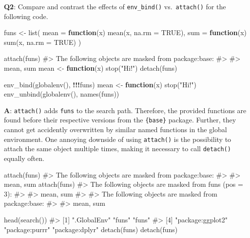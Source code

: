 \documentclass[
]{krantz}
\makeatletter
\newenvironment{Shaded}{\begin{snugshade}}{\end{snugshade}}
\newcommand{\CommentTok}[1]{\textcolor[rgb]{0.56,0.35,0.01}{\textit{#1}}}
\newcommand{\ControlFlowTok}[1]{\textcolor[rgb]{0.13,0.29,0.53}{\textbf{#1}}}
\newcommand{\DataTypeTok}[1]{\textcolor[rgb]{0.13,0.29,0.53}{#1}}
\newcommand{\KeywordTok}[1]{\textcolor[rgb]{0.13,0.29,0.53}{\textbf{#1}}}
\newcommand{\NormalTok}[1]{#1}
\newcommand{\OperatorTok}[1]{\textcolor[rgb]{0.81,0.36,0.00}{\textbf{#1}}}
\newcommand{\OtherTok}[1]{\textcolor[rgb]{0.56,0.35,0.01}{#1}}
\newcommand{\StringTok}[1]{\textcolor[rgb]{0.31,0.60,0.02}{#1}}
\newenvironment{kframe}{%
\medskip{}
\setlength{\fboxsep}{.8em}
 \def\at@end@of@kframe{}%
 \ifinner\ifhmode%
  \def\at@end@of@kframe{\end{minipage}}%
  \begin{minipage}{\columnwidth}%
 \fi\fi%
 \def\FrameCommand##1{\hskip\@totalleftmargin \hskip-\fboxsep
 \colorbox{shadecolor}{##1}\hskip-\fboxsep
     \hskip-\linewidth \hskip-\@totalleftmargin \hskip\columnwidth}%
 \MakeFramed {\advance\hsize-\width
   \@totalleftmargin\z@ \linewidth\hsize
   \@setminipage}}%
 {\par\unskip\endMakeFramed%
 \at@end@of@kframe}
\renewenvironment{Shaded}{\begin{kframe}}{\end{kframe}}
\renewcommand{\KeywordTok} [1]{\textcolor[rgb]{0.00,0.44,0.13}{{#1}}}
\renewcommand{\DataTypeTok}[1]{\textcolor[rgb]{0.56,0.13,0.00}{{#1}}}
\renewcommand{\StringTok}  [1]{\textcolor[rgb]{0.25,0.44,0.63}{{#1}}}
\renewcommand{\CommentTok} [1]{\textcolor[rgb]{0.38,0.63,0.69}{{#1}}}
\renewcommand{\OtherTok}   [1]{\textcolor[rgb]{0.00,0.44,0.13}{{#1}}}
\renewcommand{\NormalTok}  [1]{{#1}}
\makeatother
\begin{document}
\textbf{{Q2}}: Compare and contrast the effects of \texttt{env\_bind()} vs.~\texttt{attach()} for the following code.

\begin{Shaded}
\begin{Highlighting}[]
\NormalTok{funs <-}\StringTok{ }\KeywordTok{list}\NormalTok{(}
  \DataTypeTok{mean =} \ControlFlowTok{function}\NormalTok{(x) }\KeywordTok{mean}\NormalTok{(x, }\DataTypeTok{na.rm =} \OtherTok{TRUE}\NormalTok{),}
  \DataTypeTok{sum =} \ControlFlowTok{function}\NormalTok{(x) }\KeywordTok{sum}\NormalTok{(x, }\DataTypeTok{na.rm =} \OtherTok{TRUE}\NormalTok{)}
\NormalTok{)}

\KeywordTok{attach}\NormalTok{(funs)}
\CommentTok{#> The following objects are masked from package:base:}
\CommentTok{#> }
\CommentTok{#>     mean, sum}
\NormalTok{mean <-}\StringTok{ }\ControlFlowTok{function}\NormalTok{(x) }\KeywordTok{stop}\NormalTok{(}\StringTok{"Hi!"}\NormalTok{)}
\KeywordTok{detach}\NormalTok{(funs)}

\KeywordTok{env_bind}\NormalTok{(}\KeywordTok{globalenv}\NormalTok{(), }\OperatorTok{!!!}\NormalTok{funs)}
\NormalTok{mean <-}\StringTok{ }\ControlFlowTok{function}\NormalTok{(x) }\KeywordTok{stop}\NormalTok{(}\StringTok{"Hi!"}\NormalTok{) }
\KeywordTok{env_unbind}\NormalTok{(}\KeywordTok{globalenv}\NormalTok{(), }\KeywordTok{names}\NormalTok{(funs))}
\end{Highlighting}
\end{Shaded}

\textbf{{A}}: \texttt{attach()} adds \texttt{funs} to the search path. Therefore, the provided functions are found before their respective versions from the \texttt{\{base\}} package. Further, they cannot get accidently overwritten by similar named functions in the global environment. One annoying downside of using \texttt{attach()} is the possibility to attach the same object multiple times, making it necessary to call \texttt{detach()} equally often.

\begin{Shaded}
\begin{Highlighting}[]
\KeywordTok{attach}\NormalTok{(funs)}
\CommentTok{#> The following objects are masked from package:base:}
\CommentTok{#> }
\CommentTok{#>     mean, sum}
\KeywordTok{attach}\NormalTok{(funs)}
\CommentTok{#> The following objects are masked from funs (pos = 3):}
\CommentTok{#> }
\CommentTok{#>     mean, sum}
\CommentTok{#> }
\CommentTok{#> The following objects are masked from package:base:}
\CommentTok{#> }
\CommentTok{#>     mean, sum}

\KeywordTok{head}\NormalTok{(}\KeywordTok{search}\NormalTok{())}
\CommentTok{#> [1] ".GlobalEnv"      "funs"            "funs"           }
\CommentTok{#> [4] "package:ggplot2" "package:purrr"   "package:dplyr"}
\KeywordTok{detach}\NormalTok{(funs)}
\KeywordTok{detach}\NormalTok{(funs)}
\end{Highlighting}
\end{Shaded}
\end{document}
